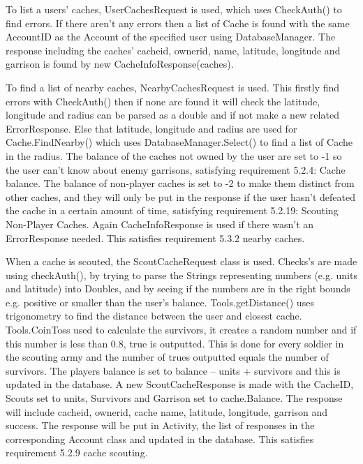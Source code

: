 To list a users' caches, UserCachesRequest is used, which uses CheckAuth() to find errors. If there aren't any errors then a list of Cache is found with the same AccountID as the Account of the specified user using DatabaseManager. The response including the caches' cacheid, ownerid, name, latitude, longitude and garrison is found by new CacheInfoResponse(caches).

To find a list of nearby caches, NearbyCachesRequest is used. This firstly find errors with CheckAuth() then if none are found it will check the latitude, longitude and radius can be parsed as a double and if not make a new related ErrorResponse. Else that latitude, longitude and radius are used for Cache.FindNearby() which uses DatabaseManager.Select() to find a list of Cache in the radius. The balance of the caches not owned by the user are set to -1 so the user can't know about enemy garrisons, satisfying requirement 5.2.4: Cache balance. The balance of non-player caches is set to -2 to make them distinct from other caches, and they will only be put in the response if the user hasn't defeated the cache in a certain amount of time, satisfying requirement 5.2.19: Scouting Non-Player Caches. Again CacheInfoResponse is used if there wasn't an ErrorResponse needed. This satisfies requirement 5.3.2 nearby caches.

When a cache is scouted, the ScoutCacheRequest class is used. Checks's are made using checkAuth(), by trying to parse the Strings representing numbers (e.g. units and latitude) into Doubles, and by seeing if the numbers are in the right bounds e.g. positive or smaller than the user's balance. Tools.getDistance() uses trigonometry to find the distance between the user and closest cache. Tools.CoinToss used to calculate the survivors, it creates a random number and if this number is less than 0.8, true is outputted. This is done for every soldier in the scouting army and the number of trues outputted equals the number of survivors. The players balance is set to balance – units + survivors and this is updated in the database. A new ScoutCacheResponse is made with the CacheID, Scouts set to units, Survivors and Garrison set to cache.Balance. The response will include cacheid, ownerid, cache name, latitude, longitude, garrison and success. The response will be put in Activity, the list of responses in the corresponding Account class and updated in the database. This satisfies requirement 5.2.9 cache scouting.


